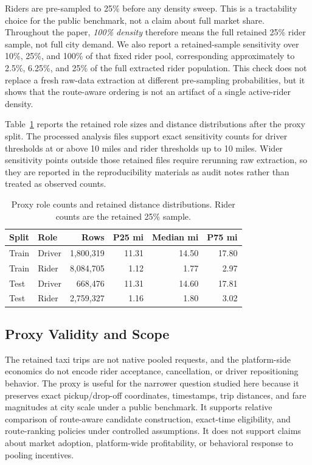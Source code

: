 \documentclass[journal]{IEEEtran}
\begin{document}
Riders are pre-sampled to 25\% before any density sweep. This is a tractability choice for the public benchmark, not a claim about full market share. Throughout the paper, \emph{100\% density} therefore means the full retained 25\% rider sample, not full city demand. We also report a retained-sample sensitivity over 10\%, 25\%, and 100\% of that fixed rider pool, corresponding approximately to 2.5\%, 6.25\%, and 25\% of the full extracted rider population. This check does not replace a fresh raw-data extraction at different pre-sampling probabilities, but it shows that the route-aware ordering is not an artifact of a single active-rider density.

Table~\ref{tab:proxy_distribution} reports the retained role sizes and distance distributions after the proxy split. The processed analysis files support exact sensitivity counts for driver thresholds at or above 10 miles and rider thresholds up to 10 miles. Wider sensitivity points outside those retained files require rerunning raw extraction, so they are reported in the reproducibility materials as audit notes rather than treated as observed counts.

\begin{table}[!t]
\caption{Proxy role counts and retained distance distributions. Rider counts are the retained 25\% sample.}
\label{tab:proxy_distribution}
\centering
\scriptsize
\setlength{\tabcolsep}{3.0pt}
\begin{tabular}{|l|l|r|r|r|r|}
\hline
Split & Role & Rows & P25 mi & Median mi & P75 mi \\
\hline
Train & Driver & 1{,}800{,}319 & 11.31 & 14.50 & 17.80 \\
\hline
Train & Rider & 8{,}084{,}705 & 1.12 & 1.77 & 2.97 \\
\hline
Test & Driver & 668{,}476 & 11.31 & 14.60 & 17.81 \\
\hline
Test & Rider & 2{,}759{,}327 & 1.16 & 1.80 & 3.02 \\
\hline
\end{tabular}
\end{table}

\subsection{Proxy Validity and Scope}
The retained taxi trips are not native pooled requests, and the platform-side economics do not encode rider acceptance, cancellation, or driver repositioning behavior. The proxy is useful for the narrower question studied here because it preserves exact pickup/drop-off coordinates, timestamps, trip distances, and fare magnitudes at city scale under a public benchmark. It supports relative comparison of route-aware candidate construction, exact-time eligibility, and route-ranking policies under controlled assumptions. It does not support claims about market adoption, platform-wide profitability, or behavioral response to pooling incentives.
\end{document}
